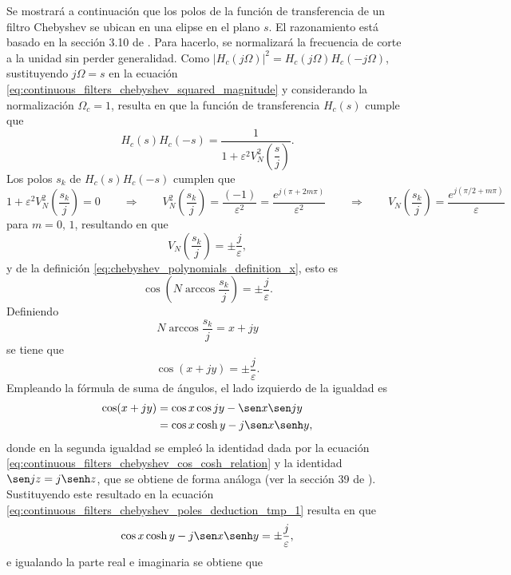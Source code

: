 \documentclass[a4paper]{report}
\begin{document}
Se mostrará a continuación que los polos de la función de transferencia de un filtro Chebyshev se ubican en una elipse en el plano \(s\). El razonamiento está basado en la sección 3.10 de \cite{daniels1974approximation}. Para hacerlo, se normalizará la frecuencia de corte a la unidad sin perder generalidad. Como \(|H_c(j\Omega)|^2=H_c(j\Omega)H_c(-j\Omega)\), sustituyendo \(j\Omega=s\) en la ecuación \ref{eq:continuous_filters_chebyshev_squared_magnitude} y considerando la normalización \(\Omega_c=1\), resulta en que la función de transferencia \(H_c(s)\) cumple que 
\begin{equation}\label{eq:continuous_filters_chebyshev_squared_magnitude_s}
 H_c(s)H_c(-s)=\dfrac{1}{1+\varepsilon^2V^2_N\left(\dfrac{s}{j}\right)}. 
\end{equation}
Los polos \(s_k\) de \(H_c(s)H_c(-s)\) cumplen que 
\[
 1+\varepsilon^2V^2_N\left(\dfrac{s_k}{j}\right)=0
 \qquad\Rightarrow\qquad
 V^2_N\left(\dfrac{s_k}{j}\right)=\frac{(-1)}{\varepsilon^2}=\frac{e^{j(\pi+2m\pi)}}{\varepsilon^2}
 \qquad\Rightarrow\qquad
 V_N\left(\dfrac{s_k}{j}\right)=\frac{e^{j(\pi/2+m\pi)}}{\varepsilon}
\]
para \(m=0,\,1\), resultando en que 
\[
 V_N\left(\frac{s_k}{j}\right)=\pm\frac{j}{\varepsilon},
\]
y de la definición \ref{eq:chebyshev_polynomials_definition_x}, esto es
\[
 \cos\left(N\arccos\frac{s_k}{j}\right)=\pm\frac{j}{\varepsilon}.
\]
Definiendo
\begin{equation}\label{eq:continuous_filters_chebyshev_poles_deduction_tmp_3}
 N\arccos\frac{s_k}{j}=x+jy 
\end{equation}
se tiene que 
\begin{equation}\label{eq:continuous_filters_chebyshev_poles_deduction_tmp_1}
 \cos(x+jy)=\pm\frac{j}{\varepsilon}. 
\end{equation}
Empleando la fórmula de suma de ángulos, el lado izquierdo de la igualdad es
\begin{align*}
 \cos(x+jy)&=\cos x\cos jy-\sen x\sen jy\\
   &=\cos x\cosh y-j\sen x\senh y,
\end{align*}
donde en la segunda igualdad se empleó la identidad dada por la ecuación \ref{eq:continuous_filters_chebyshev_cos_cosh_relation} y la identidad \(\sen jz=j\senh z\), que se obtiene de forma análoga (ver la sección 39 de \cite{brown2013complex}). Sustituyendo este resultado en la ecuación \ref{eq:continuous_filters_chebyshev_poles_deduction_tmp_1} resulta en que 
\[
 \cos x\cosh y-j\sen x\senh y=\pm\frac{j}{\varepsilon},
\]
e igualando la parte real e imaginaria se obtiene que 
\end{document}
